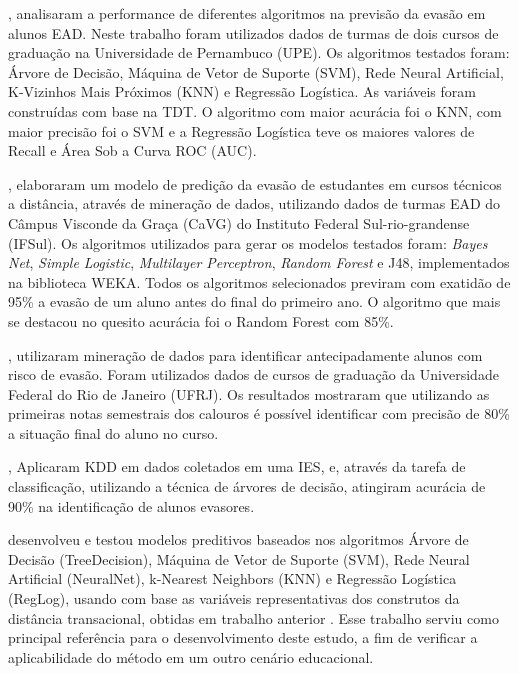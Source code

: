 , analisaram a performance de diferentes algoritmos
na previsão da evasão em alunos EAD. Neste trabalho foram utilizados dados de
turmas de dois cursos de graduação na Universidade de Pernambuco (UPE). Os
algoritmos testados foram: Árvore de Decisão, Máquina de Vetor de Suporte
(SVM), Rede Neural Artificial, K-Vizinhos Mais Próximos (KNN) e Regressão
Logística. As variáveis foram construídas com base na TDT. O algoritmo com maior
acurácia foi o KNN, com maior precisão foi o SVM e a Regressão Logística teve os
maiores valores de Recall e Área Sob a Curva ROC (AUC).

, elaboraram um modelo de predição da evasão de
estudantes em cursos técnicos a distância, através de mineração de dados,
utilizando dados de turmas EAD do Câmpus Visconde da Graça (CaVG) do Instituto
Federal Sul-rio-grandense (IFSul). Os algoritmos utilizados para gerar os
modelos testados foram: \textit{Bayes Net}, \textit{Simple Logistic},
\textit{Multilayer Perceptron}, \textit{Random Forest} e J48, implementados na
biblioteca WEKA. Todos os algoritmos selecionados previram com exatidão de 95\%
a evasão de um aluno antes do final do primeiro ano. O algoritmo que mais se
destacou no quesito acurácia foi o Random Forest com 85\%.

, utilizaram mineração de dados para identificar
antecipadamente alunos com risco de evasão. Foram utilizados dados de cursos de
graduação da Universidade Federal do Rio de Janeiro (UFRJ). Os resultados
mostraram que utilizando as primeiras notas semestrais dos calouros é possível
identificar com precisão de 80\% a situação final do aluno no curso.

, Aplicaram KDD em dados coletados em uma IES,
e, através da tarefa de classificação, utilizando a técnica de árvores de
decisão, atingiram acurácia de 90\% na identificação de alunos evasores.

 desenvolveu e testou modelos preditivos baseados
nos algoritmos Árvore de Decisão (TreeDecision), Máquina de Vetor de Suporte
(SVM), Rede Neural Artificial (NeuralNet), k-Nearest Neighbors (KNN) e Regressão
Logística (RegLog), usando com base as variáveis representativas dos construtos
da distância transacional, obtidas em trabalho anterior
\cite{ramos2016mapeamento}. Esse trabalho serviu como principal referência para
o desenvolvimento deste estudo, a fim de verificar a aplicabilidade do método em
um outro cenário educacional.